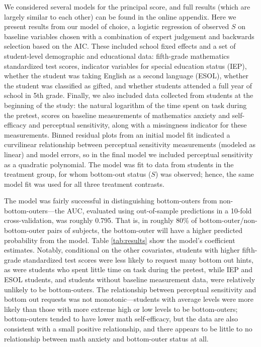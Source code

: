 \documentclass[11pt]{article} %
\begin{document}
We considered several models for the principal score, and full results (which are largely similar to each other) can be found in the online appendix. Here we present results from our model of choice, a logistic regression of observed $S$ on baseline variables chosen with a combination of expert judgement and backwards selection based on the AIC. These included school fixed effects and a set of student-level demographic and educational data: fifth-grade mathematics standardized test scores, %
indicator variables for special education status (IEP), whether the student was taking English as a second language (ESOL), whether the student was classified as gifted, and whether students attended a full year of school in 5th grade. Finally, we also included data collected from students at the beginning of the study: the natural logarithm of the  time spent on task during the pretest, scores on baseline measurements of mathematics anxiety and self-efficacy and perceptual sensitivity, along with a missingness indicator for these measurements.
Binned residual plots \citep{gelman2006data} from an initial model fit indicated a curvilinear relationship between perceptual sensitivity measurements (modeled as linear) and model errors, so in the final model we included perceptual sensitivity as a quadratic polynomial.
The model was fit to data from students in the treatment group, for whom bottom-out status ($S$) was observed; hence, the same model fit was used for all three treatment contrasts.

The model was fairly successful in distinguishing bottom-outers from non-bottom-outers---the AUC, evaluated using out-of-sample predictions in a 10-fold cross-validation, was roughly 0.795. That is, in roughly 80\% of bottom-outer/non-bottom-outer pairs of subjects, the bottom-outer will have a higher predicted probability from the model.
Table \ref{tab:results} show the model's coefficient estimates. Notably, conditional on the other covariates, students with higher fifth-grade standardized test scores were less likely to request many bottom out hints, as were students who spent little time on task during the pretest, while IEP and ESOL students, and students without baseline measurement data, were relatively unlikely to be bottom-outers. The relationship between perceptual sensitivity and bottom out requests was not monotonic---students with average levels were more likely than those with more extreme high or low levels to be bottom-outers; bottom-outers tended to have lower math self-efficacy, but the data are also consistent with a small positive relationship, and there appears to be little to no relationship between math anxiety and bottom-outer status at all.
\end{document}
